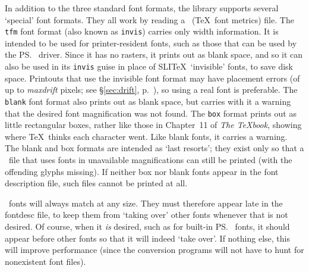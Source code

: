 In addition to the three standard font formats,
the library supports several `special' font formats.
They all work by reading a \tfm\ (\TeX\ font metrics) file.
The {\tt tfm} font format
(also known as {\tt invis})
carries only width information.
It is intended to be used for printer-resident fonts,
such as those that can be used by the \ps\ driver.
Since it has no rasters,
it prints out as blank space,
and so it can also be used
in its {\tt invis} guise
in place of S{\small LI}\TeX\ `invisible' fonts,
to save disk space.
Printouts that use the invisible font format
may have placement errors
(of up to {\em maxdrift\/} pixels;
see \S\ref{sec:drift}, p.~\pageref{sec:drift}),
so using a real font is preferable.
The {\tt blank} font format also prints out as blank space,
but carries with it a warning that the desired font magnification
was not found.
The {\tt box} format prints out as little rectangular boxes,
rather like those in Chapter~11 of {\em The \TeX book},
showing where \TeX\ thinks each character went.
Like blank fonts, it carries a warning.
The blank and box formats
are intended as `last resorts';
they exist
only so that a \dvi\ file that uses fonts in unavailable magnifications
can still be printed (with the offending glyphs missing).
If neither box nor blank fonts appear in the font description file,
such files cannot be printed at all.

\tfm\ fonts will always match at any size.
They must therefore appear late in the fontdesc file,
to keep them from `taking over' other fonts
whenever that is not desired.
Of course, when it {\em is\/} desired,
such as for built-in \ps\ fonts,
it should appear before other fonts so that it will indeed `take over'.
If nothing else,
this will improve performance
(since the conversion programs
will not have to hunt for nonexistent font files).

